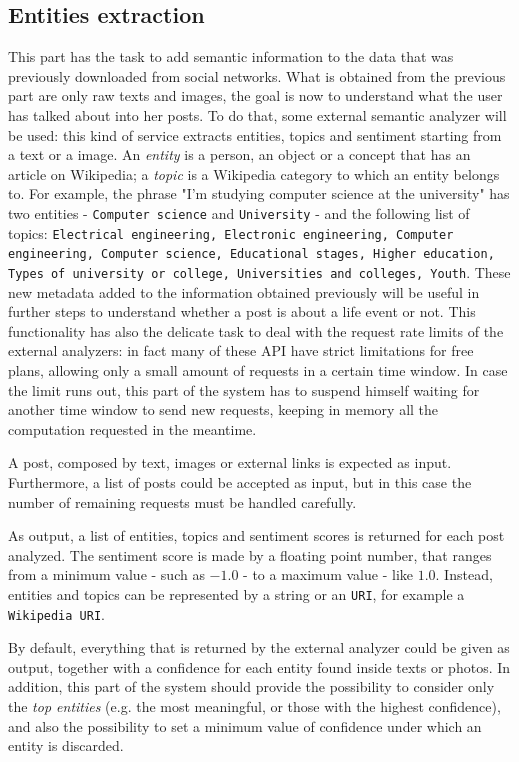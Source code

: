 \subsection{Entities extraction}
This part has the task to add semantic information to the data that was previously downloaded from social networks. What is obtained from the previous part are only raw texts and images, the goal is now to understand what the user has talked about into her posts. To do that, some external semantic analyzer will be used: this kind of service extracts entities, topics and sentiment starting from a text or a image. An \textit{entity} is a person, an object or a concept that has an article on Wikipedia; a \textit{topic} is a Wikipedia category to which an entity belongs to. For example, the phrase "I'm studying computer science at the university" has two entities - \texttt{Computer science} and \texttt{University} - and the following list of topics: \texttt{Electrical engineering, Electronic engineering, Computer engineering, Computer science, Educational stages, Higher education, Types of university or col\-le\-ge, Universities and colleges, Youth}. These new metadata added to the information obtained previously will be useful in further steps to understand whether a post is about a life event or not. This functionality has also the delicate task to deal with the request rate limits of the external analyzers: in fact many of these API have strict limitations for free plans, allowing only a small amount of requests in a certain time window. In case the limit runs out, this part of the system has to suspend himself waiting for another time window to send new requests, keeping in memory all the computation requested in the meantime.

A post, composed by text, images or external links is expected as input. Furthermore, a list of posts could be accepted as input, but in this case the number of remaining requests must be handled carefully.

As output, a list of entities, topics and sentiment scores is returned for each post analyzed. The sentiment score is made by a floating point number, that ranges from a minimum value - such as $ -1.0 $ - to a maximum value - like $ 1.0 $. Instead, entities and topics can be represented by a string or an \texttt{URI}, for example a \texttt{Wikipedia URI}.

By default, everything that is returned by the external analyzer could be given as output, together with a confidence for each entity found inside texts or photos. In addition, this part of the system should provide the possibility to consider only the \textit{top entities} (e.g. the most meaningful, or those with the highest confidence), and also the possibility to set a minimum value of confidence under which an entity is discarded.

